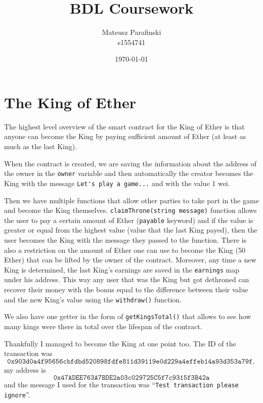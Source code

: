 \documentclass{article}
\title{BDL Coursework}
\author{Mateusz Parafinski\\\small s1554741}
\date{\today}
\begin{document}
    \maketitle

    \section{The King of Ether}
    The highest level overview of the smart contract for the
    King of Ether is that anyone can become the King by
    paying sufficient amount of Ether (at least as much as
    the last King).
    \newline

    \noindent When the contract is created, we are saving
    the information about the address of the owner in the
    \verb|owner| variable and then automatically the creator
    becomes the King with the message \verb|Let's play a game...| 
    and with the value 1 wei.
    \newline

    \noindent Then we have multiple functions that allow
    other parties to take part in the game and become the
    King themselves. \verb|claimThrone(string message)|
    function allows the user to pay a certain amount of
    Ether (\verb|payable| keyword) and if the value is
    greater or equal from the highest value (value that the
    last King payed), then the user becomes the King with
    the message they passed to the function. There is also a
    restriction on the amount of Ether one can use to become
    the King (50 Ether) that can be lifted by the owner of
    the contract. Moreover, any time a
    new King is determined, the last King's earnings are
    saved in the \verb|earnings| map under his address. This
    way any user that was the King but got dethroned can
    recover their money with the bonus equal to the
    difference between their value and the new King's value
    using the \verb|withdraw()| function.
    \newline

    \noindent We also have one getter in the form of
    \verb|getKingsTotal()| that allows to see how many kings
    were there in total over the lifespan of the contract.
    \newline

    \noindent Thankfully I managed to become the King at one
    point too. The ID of the transaction was 
    \[
        \texttt{0x903d0a4f95656cbfdbd520898fdfe811d39119e0d229a4effeb14a93d353a79f},
    \]
    my address is
    \[
        \texttt{0x47ADEE763A7BDE2a03c029725C5f7c9315f3B42a}
    \]
    and the message I used for the transaction was
    ``\verb|Test transaction please ignore|''.
\end{document}
